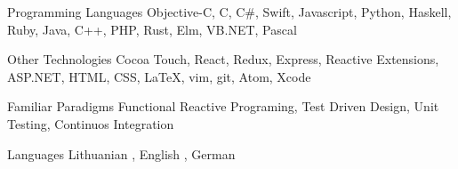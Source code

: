 

\begin{cvskills}

  \cvskill
    {Programming Languages} %
    {Objective-C, C, C\#, Swift, Javascript, Python, Haskell, Ruby, Java, C++, PHP, Rust, Elm, VB.NET, Pascal} %

  \cvskill
    {Other Technologies} %
    {Cocoa Touch, React, Redux, Express, Reactive Extensions, ASP.NET, HTML, CSS, LaTeX, vim, git, Atom, Xcode} %

  \cvskill
    {Familiar Paradigms} %
    {Functional Reactive Programing, Test Driven Design, Unit Testing, Continuos Integration} %

  \cvskill
    {Languages} %
    {Lithuanian \textit{\color{gray}{(native)}}, English \textit{\color{gray}{(bilingual)}}, German \textit{\color{gray}{(basic)}}} %

\end{cvskills}
